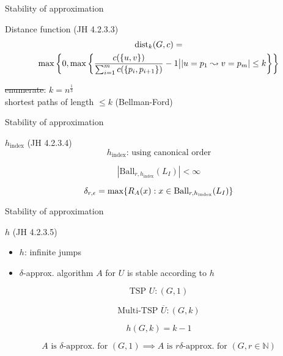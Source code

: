\begin{frame}{Stability of approximation}
  \begin{exampleblock}{Distance function (JH 4.2.3.3)}
	\begin{gather*}
	  \text{dist}_{k}(G,c) = \\
	  \max\left\{0, \max\left\{ \frac{c(\{u,v\})}{\sum_{i=1}^{m} c(\{p_i, p_{i+1}\})} - 1 \bigl \lvert |u = p_1 \leadsto v = p_m| \le k \right\}\right\}
	\end{gather*}
  \end{exampleblock}

  \begin{center}
	\sout{enumerate}: $k = n^{\frac{1}{3}}$ \\[5pt]
    shortest paths of length $\le k$ (Bellman-Ford)
  \end{center}
\end{frame}
\begin{frame}{Stability of approximation}
  \begin{exampleblock}{$h_{\text{index}}$ (JH 4.2.3.4)}
	\[
	  h_{\text{index}}\text{: using canonical order}
	\]
  \end{exampleblock}

  \[
	|\text{Ball}_{r, h_{\text{index}}}(L_I)| < \infty
  \]

  \[
	\delta_{r, \epsilon} = \max \{R_A(x): x \in \text{Ball}_{r, h_{\text{index}}}(L_I)\}
  \]
\end{frame}
\begin{frame}{Stability of approximation}
  \begin{exampleblock}{$h$ (JH 4.2.3.5)}
	\begin{itemize}
	  \item $h$: infinite jumps
	  \item $\delta$-approx. algorithm $A$ for $U$ is stable according to $h$
	\end{itemize}
  \end{exampleblock}

  \[
	\text{TSP } U:  (G, 1)
  \]

  \[
	\text{Multi-TSP } \overline{U}: (G, k)
  \]

  \[
	h(G,k) = k-1
  \]

  \[
	A \text{ is } \delta\text{-approx. for } (G, 1) \implies A \text{ is } r\delta\text{-approx. for } (G,r \in \mathbb{N})
  \]
\end{frame}
